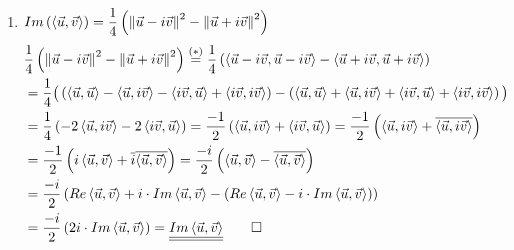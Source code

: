 \documentclass[12pt]{article}
\begin{document}
\begin{enumerate}
  \item $Im\left(\left< \vec{u},\vec{v} \right>\right) = \dfrac{1}{4}\left( \left\lVert\vec{u}-i\vec{v}\right\rVert^2 - \left\lVert\vec{u}+i\vec{v}\right\rVert^2 \right)$
    \medskip
    \begin{align*}
      &\dfrac{1}{4}\left( \left\lVert\vec{u}-i\vec{v}\right\rVert^2 - \left\lVert\vec{u}+i\vec{v}\right\rVert^2 \right) \overset{(*)}{=} 
        \dfrac{1}{4}\left( \left<\vec{u}-i\vec{v},\vec{u}-i\vec{v}\right> - \left<\vec{u}+i\vec{v},\vec{u}+i\vec{v}\right> \right) \\
      & = \dfrac{1}{4}\big( 
        \left(
          \left<\vec{u},\vec{u}\right>-
          \left<\vec{u},i\vec{v}\right>-
          \left<i\vec{v},\vec{u}\right>+
          \left<i\vec{v},i\vec{v}\right>
        \right)
        - \left(
          \left<\vec{u},\vec{u}\right>+
          \left<\vec{u},i\vec{v}\right>+
          \left<i\vec{v},\vec{u}\right>+
          \left<i\vec{v},i\vec{v}\right>
        \right)
      \big) \\
      & = \dfrac{1}{4}\left( -2\left<\vec{u},i\vec{v}\right> -2\left<i\vec{v},\vec{u}\right> \right)
        = \dfrac{-1}{2}\left( \left<\vec{u},i\vec{v}\right> + \left<i\vec{v},\vec{u}\right> \right)
        = \dfrac{-1}{2}\left( \left<\vec{u},i\vec{v}\right> + \overline{\left<\vec{u},i\vec{v}\right>} \right) \\
      & = \dfrac{-1}{2}\left( i\left<\vec{u},\vec{v}\right> + \overline{i}\overline{\left<\vec{u},\vec{v}\right>} \right)
        = \dfrac{-i}{2}\left( \left<\vec{u},\vec{v}\right> - \overline{\left<\vec{u},\vec{v}\right>} \right) \\
      & = \dfrac{-i}{2}\left( Re\left<\vec{u},\vec{v}\right> + i\cdot Im\left<\vec{u},\vec{v}\right> - (Re\left<\vec{u},\vec{v}\right> - i\cdot Im\left<\vec{u},\vec{v}\right>) \right) \\
      & = \dfrac{-i}{2}\left( 2i\cdot Im \left<\vec{u},\vec{v}\right>\right) = \underline{\underline{Im \left<\vec{u},\vec{v}\right>}} \quad \quad \square
    \end{align*}











































\end{enumerate}
\end{document}
